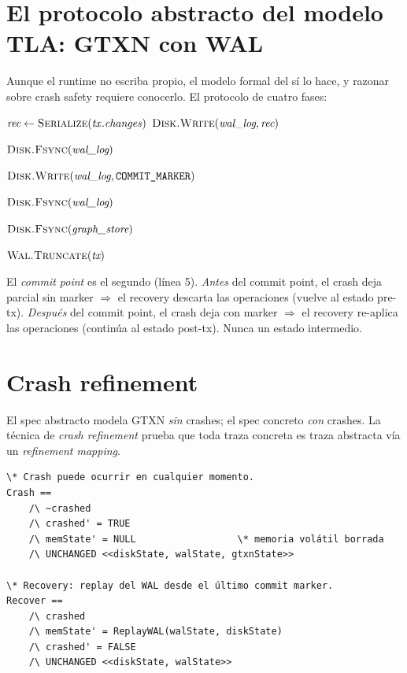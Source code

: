 \section{El protocolo abstracto del modelo TLA: GTXN con WAL}

Aunque el runtime no escriba \wal{} propio, el modelo formal del
 sí lo hace, y razonar sobre crash safety
requiere conocerlo. El protocolo de cuatro fases:

\begin{algorithm}[H]
\SetAlgoLined
{}
\caption{\textsc{GtxnCommit} (modelo formal)}\label{alg:gtxn-commit}


$\textit{rec} \gets \textsc{Serialize}(\mathit{tx.changes})$\;
$\textsc{Disk.Write}(\textit{wal\_log}, \textit{rec})$\;

$\textsc{Disk.Fsync}(\textit{wal\_log})$\;


$\textsc{Disk.Write}(\textit{wal\_log}, \texttt{COMMIT\_MARKER})$\;

$\textsc{Disk.Fsync}(\textit{wal\_log})$\;


$\textsc{Disk.Fsync}(\textit{graph\_store})$\;


$\textsc{Wal.Truncate}(\textit{tx})$\;
\end{algorithm}

El \emph{commit point} es el segundo \fsync{} (línea 5).
\emph{Antes} del commit point, el crash deja \wal{} parcial sin marker
$\Rightarrow$ el recovery descarta las operaciones (vuelve al estado
pre-tx). \emph{Después} del commit point, el crash deja \wal{} con
marker $\Rightarrow$ el recovery re-aplica las operaciones (continúa al
estado post-tx). Nunca un estado intermedio.

\section{Crash refinement}

El spec abstracto  modela GTXN
\emph{sin} crashes; el spec concreto 
\emph{con} crashes. La técnica de \emph{crash refinement}
\cite{Sigurbjarnarson2016} prueba que toda traza concreta es traza
abstracta vía un \emph{refinement mapping}.

\begin{lstlisting}[language=tla, caption={Acciones \texttt{Crash} y
\texttt{Recover} en \citaTLA{sotfs\_crash.tla} (extracto).}, label={lst:tla-crash}]
\* Crash puede ocurrir en cualquier momento.
Crash ==
    /\ ~crashed
    /\ crashed' = TRUE
    /\ memState' = NULL                  \* memoria volátil borrada
    /\ UNCHANGED <<diskState, walState, gtxnState>>

\* Recovery: replay del WAL desde el último commit marker.
Recover ==
    /\ crashed
    /\ memState' = ReplayWAL(walState, diskState)
    /\ crashed' = FALSE
    /\ UNCHANGED <<diskState, walState>>
\end{lstlisting}

